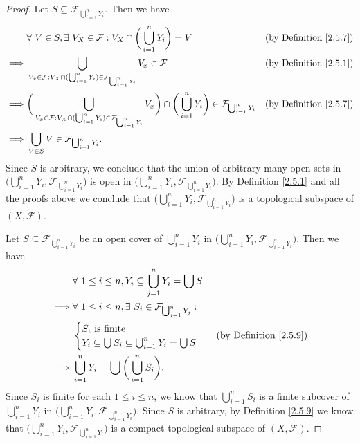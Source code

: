 \begin{proof}
    Let \(S \subseteq \mathcal{F}_{\bigcup_{i = 1}^n Y_i}\).
    Then we have
    \begin{align*}
                 & \forall\ V \in S, \exists\ V_X \in \mathcal{F} : V_X \cap \bigg(\bigcup_{i = 1}^n Y_i\bigg) = V                                                                                                         & \text{(by Definition \ref{2.5.7})} \\
        \implies & \bigcup_{V_x \in \mathcal{F} : V_X \cap (\bigcup_{i = 1}^n Y_i) \in \mathcal{F}_{\bigcup_{i = 1}^n Y_i}} V_x \in \mathcal{F}                                                                            & \text{(by Definition \ref{2.5.1})} \\
        \implies & \bigg(\bigcup_{V_x \in \mathcal{F} : V_X \cap (\bigcup_{i = 1}^n Y_i) \in \mathcal{F}_{\bigcup_{i = 1}^n Y_i}} V_x\bigg) \cap \bigg(\bigcup_{i = 1}^n Y_i\bigg) \in \mathcal{F}_{\bigcup_{i = 1}^n Y_i} & \text{(by Definition \ref{2.5.7})} \\
        \implies & \bigcup_{V \in S} V \in \mathcal{F}_{\bigcup_{i = 1}^n Y_i}.
    \end{align*}
    Since \(S\) is arbitrary, we conclude that the union of arbitrary many open sets in \(\big(\bigcup_{i = 1}^n Y_i, \mathcal{F}_{\bigcup_{i = 1}^n Y_i}\big)\) is open in \(\big(\bigcup_{i = 1}^n Y_i, \mathcal{F}_{\bigcup_{i = 1}^n Y_i}\big)\).
    By Definition \ref{2.5.1} and all the proofs above we conclude that \(\big(\bigcup_{i = 1}^n Y_i, \mathcal{F}_{\bigcup_{i = 1}^n Y_i}\big)\) is a topological subspace of \((X, \mathcal{F})\).

    Let \(S \subseteq \mathcal{F}_{\bigcup_{i = 1}^n Y_i}\) be an open cover of \(\bigcup_{i = 1}^n Y_i\) in \(\big(\bigcup_{i = 1}^n Y_i, \mathcal{F}_{\bigcup_{i = 1}^n Y_i}\big)\).
    Then we have
    \begin{align*}
                 & \forall\ 1 \leq i \leq n, Y_i \subseteq \bigcup_{j = 1}^n Y_i = \bigcup S                                             \\
        \implies & \forall\ 1 \leq i \leq n, \exists\ S_i \in \mathcal{F}_{\bigcup_{j = 1}^n Y_j} :                                      \\
                 & \begin{cases}
            S_i \text{ is finite} \\
            Y_i \subseteq \bigcup S_i \subseteq \bigcup_{i = 1}^n Y_i = \bigcup S
        \end{cases}                                                      & \text{(by Definition \ref{2.5.9})} \\
        \implies & \bigcup_{i = 1}^n Y_i = \bigcup \bigg(\bigcup_{i = 1}^n S_i\bigg).
    \end{align*}
    Since \(S_i\) is finite for each \(1 \leq i \leq n\), we know that \(\bigcup_{i = 1}^n S_i\) is a finite subcover of \(\bigcup_{i = 1}^n Y_i\) in \(\big(\bigcup_{i = 1}^n Y_i, \mathcal{F}_{\bigcup_{i = 1}^n Y_i}\big)\).
    Since \(S\) is arbitrary, by Definition \ref{2.5.9} we know that \(\big(\bigcup_{i = 1}^n Y_i, \mathcal{F}_{\bigcup_{i = 1}^n Y_i}\big)\) is a compact topological subspace of \((X, \mathcal{F})\).


\end{proof}
